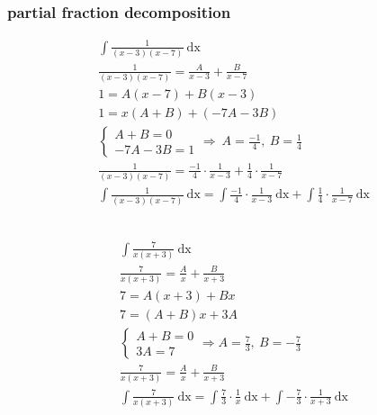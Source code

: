 \documentclass[a4paper,12pt]{article}
\newcommand{\?}{\stackrel{?}{=}}
\begin{document}
\subsubsection{partial fraction decomposition}
\label{sec:org01f21e2}
\begin{my_example}
\begin{gather*}
  \int \frac{1}{(x-3)(x-7)} \ \mathrm{dx}\\
  \frac{1}{(x-3)(x-7)} = \frac{A}{x-3} + \frac{B}{x-7}\\
  1 = A(x-7) + B(x-3)\\
  1 = x(A+B)+(-7A-3B)\\
  \begin{cases}
    A+B = 0\\
    -7A-3B=1
  \end{cases}
  \Rightarrow
  \ A = \frac{-1}{4},\ B = \frac14\\
  \frac{1}{(x-3)(x-7)} = \frac{-1}{4} \cdot \frac{1}{x-3} + \frac14 \cdot \frac{1}{x-7}\\
  \int \frac{1}{(x-3)(x-7)} \ \mathrm{dx} = \int \frac{-1}{4} \cdot \frac{1}{x-3} \ \mathrm{dx} + \int \frac14 \cdot \frac{1}{x-7} \ \mathrm{dx}
\end{gather*}
\end{my_example}

\begin{my_example}
\\[0pt]


\begin{gather*}
  \int \frac{7}{x(x+3)} \ \mathrm{dx}\\
  \frac{7}{x(x+3)} = \frac{A}{x} + \frac{B}{x+3}\\
  7 = A(x+3) + Bx\\
  7 = (A+B)x + 3A\\
  \begin{cases}
    A+B = 0\\
    3A = 7
  \end{cases}
  \Rightarrow A = \frac73,\ B=-\frac73\\
  \frac{7}{x(x+3)} = \frac{A}{x} + \frac{B}{x+3}\\
  \int \frac{7}{x(x+3)} \ \mathrm{dx} = \int \frac73 \cdot \frac{1}{x} \ \mathrm{dx} + \int -\frac73 \cdot \frac{1}{x+3} \ \mathrm{dx}\\
\end{gather*}
\end{my_example}
\end{document}
